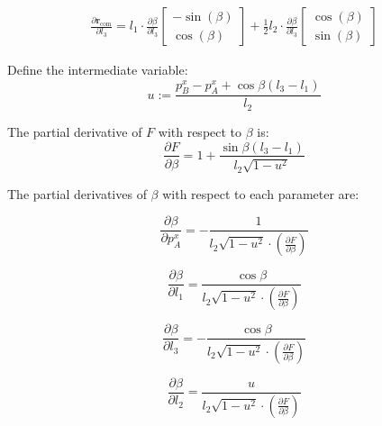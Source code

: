 \documentclass[10pt]{article}
\begin{document}
\begin{minipage}[t]{0.65\textwidth}
\begin{align*}
\frac{\partial \mathbf{r}_{\mathrm{com}}}{\partial l_3} =
l_1 \cdot \frac{\partial \beta}{\partial l_3}
\begin{bmatrix}
- \sin(\beta) \\
\cos(\beta)
\end{bmatrix}
+
\frac{1}{2} l_2 \cdot \frac{\partial \beta}{\partial l_3}
\begin{bmatrix}
\cos(\beta) \\
\sin(\beta)
\end{bmatrix}
\end{align*}

Define the intermediate variable:
\[
u := \frac{p_B^x - p_A^x + \cos\beta (l_3 - l_1)}{l_2}
\]

The partial derivative of $F$ with respect to $\beta$ is:
\[
\frac{\partial F}{\partial \beta} = 1 + \frac{\sin\beta (l_3 - l_1)}{l_2 \sqrt{1 - u^2}}
\]

The partial derivatives of $\beta$ with respect to each parameter are:

\[
\frac{\partial \beta}{\partial p_A^x}
= -\frac{1}{l_2 \sqrt{1 - u^2} \cdot \left( \frac{\partial F}{\partial \beta} \right)}
\]

\[
\frac{\partial \beta}{\partial l_1}
= \frac{\cos\beta}{l_2 \sqrt{1 - u^2} \cdot \left( \frac{\partial F}{\partial \beta} \right)}
\]

\[
\frac{\partial \beta}{\partial l_3}
= -\frac{\cos\beta}{l_2 \sqrt{1 - u^2} \cdot \left( \frac{\partial F}{\partial \beta} \right)}
\]

\[
\frac{\partial \beta}{\partial l_2}
= \frac{u}{l_2 \sqrt{1 - u^2} \cdot \left( \frac{\partial F}{\partial \beta} \right)}
\]
\end{minipage}
\hfill
\vrule width 0.4pt\relax
\hfill
\begin{minipage}[t]{0.3\textwidth}
\end{minipage}
\end{document}
